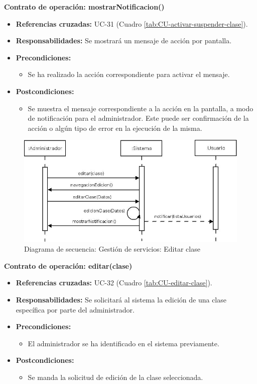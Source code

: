 \textbf{Contrato de operación: mostrarNotificacion()}
\begin{itemize}
\item \textbf{Referencias cruzadas:} UC-31 (Cuadro \ref{tab:CU-activar-suspender-clase}).
\item \textbf{Responsabilidades:} Se mostrará un mensaje de acción por pantalla.
\item \textbf{Precondiciones:} 
 \begin{itemize}
\item Se ha realizado la acción correspondiente para activar el mensaje.
\end {itemize}
\item \textbf{Postcondiciones:} 
 \begin{itemize}
\item Se muestra el mensaje correspondiente a la acción en la pantalla, a modo de notificación para el administrador. Este puede ser confirmación de la acción o algún tipo de error en la ejecución de la misma.
\end {itemize}
\end {itemize}


\vspace{10mm}

\begin{figure}[H]
\centering
  \includegraphics[scale=.50]{img/secuencias/gestion-servicios-editar-clase.jpeg}
  \caption{Diagrama de secuencia: Gestión de servicios: Editar clase}
  \label{fig:secuencia-editar-clase}
\end{figure}

\textbf{Contrato de operación: editar(clase)}
\begin{itemize}
\item \textbf{Referencias cruzadas:} UC-32 (Cuadro \ref{tab:CU-editar-clase}).
\item \textbf{Responsabilidades:} Se solicitará al sistema la edición de una clase específica por parte del administrador.
\item \textbf{Precondiciones:} 
 \begin{itemize}
\item El administrador se ha identificado en el sistema previamente.
\end {itemize}
\item \textbf{Postcondiciones:} 
 \begin{itemize}
\item Se manda la solicitud de edición de la clase seleccionada.
\end {itemize}
\end {itemize}

